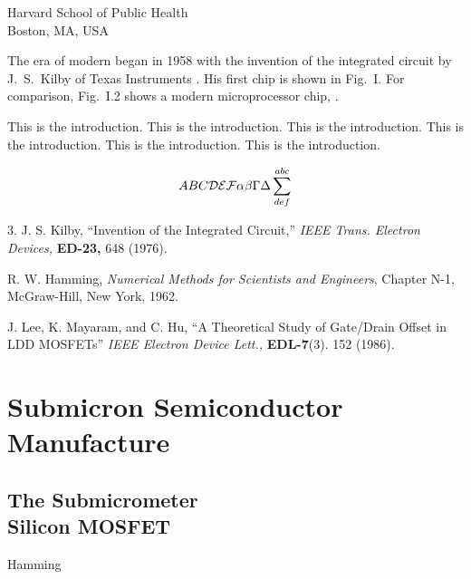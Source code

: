 \documentclass{book}
\begin{document}
\begin{introduction}


{Harvard School of Public Health\\
Boston, MA, USA}

The era of modern  
began in 1958 with the invention of the
integrated circuit by J.~S.~Kilby
 of Texas Instruments \cite{kilby}.
His first chip is shown in Fig.~I. For comparison,
Fig.~I.2 shows a modern microprocessor chip, \cite{beren}.


This is the introduction.
This is the introduction.
This is the introduction.
This is the introduction.
This is the introduction.
This is the introduction.

\begin{equation}
ABC {\cal DEF} \alpha\beta\Gamma\Delta\sum^{abc}_{def}
\end{equation}


\begin{chapreferences}{3.}
J. S. Kilby,
``Invention of the Integrated Circuit,'' {\it IEEE Trans. Electron Devices,}
{\bf ED-23,} 648 (1976).

R. W. Hamming,
                 {\it Numerical Methods for Scientists and 
                 Engineers}, Chapter N-1, McGraw-Hill, 
                 New York, 1962.

J. Lee, K. Mayaram, and C. Hu, ``A Theoretical
               Study of Gate/Drain Offset in LDD MOSFETs''
                     {\it IEEE Electron Device Lett.,} {\bf EDL-7}(3). 152 
                     (1986).
\end{chapreferences}
\end{introduction}


\part[Submicron Semiconductor Manufacture]
{Submicron Semiconductor\\ Manufacture}


\chapter[The Submicrometer Silicon MOSFET]
{The Submicrometer\\ Silicon MOSFET}


{Hamming \cite{hamming}}
\end{document}
